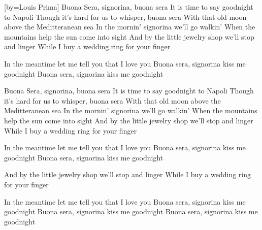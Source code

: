[by={Louis Prima}]
\beginverse
Buona Sera, signorina, buona sera
It is time to say goodnight to Napoli
Though it's hard for us to whisper, buona sera
With that old moon above the Meditteranean sea
In the mornin' signorina we'll go walkin'
When the mountains help the sun come into sight
And by the little jewelry shop we'll stop and linger
While I buy a wedding ring for your finger
\endverse 

\beginchorus
In the meantime let me tell you that I love you
Buona sera, signorina kiss me goodnight
Buona sera, signorina kiss me goodnight
\endchorus

\beginverse 
Buona Sera, signorina, buona sera
It is time to say goodnight to Napoli
Though it's hard for us to whisper, buona sera
With that old moon above the Meditteranean sea
In the mornin' signorina we'll go walkin'
When the mountains help the sun come into sight
And by the little jewelry shop we'll stop and linger
While I buy a wedding ring for your finger
\endverse

\beginchorus
In the meantime let me tell you that I love you
Buona sera, signorina kiss me goodnight
Buona sera, signorina kiss me goodnight
\endchorus

\beginverse 
And by the little jewelry shop we'll stop and linger
While I buy a wedding ring for your finger
\endverse

\beginchorus
In the meantime let me tell you that I love you
Buona sera, signorina kiss me goodnight
Buona sera, signorina kiss me goodnight
Buona sera, signorina kiss me goodnight
\endchorus
\endsong

